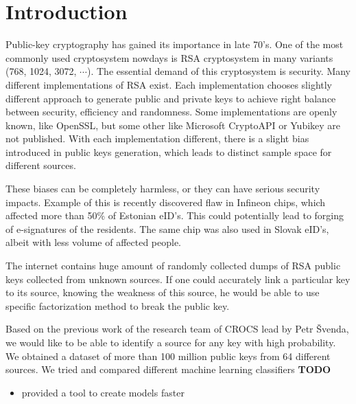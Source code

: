 \chapter*{Introduction}

Public-key cryptography has gained its importance in late 70's. One of the most commonly used cryptosystem nowdays is RSA cryptosystem in many variants (768, 1024, 3072, $\cdots$). The essential demand of this cryptosystem is security. Many different implementations of RSA exist. Each implementation chooses slightly different approach to generate public and private keys to achieve right balance between security, efficiency and randomness. Some implementations are openly known, like OpenSSL, but some other like Microsoft CryptoAPI or Yubikey are not published. With each implementation different, there is a slight bias introduced in public keys generation, which leads to distinct sample space for different sources. 

These biases can be completely harmless, or they can have serious security impacts. Example of this is recently discovered flaw in Infineon chips\cite{svenda_2}, which affected more than 50\% of Estonian eID's. This could potentially lead to forging of e-signatures of the residents. The same chip was also used in Slovak eID's, albeit with less volume of affected people.

The internet contains huge amount of randomly collected dumps of RSA public keys collected from unknown sources. If one could accurately link a particular key to its source, knowing the weakness of this source, he would be able to use specific factorization method to break the public key.

Based on the previous work\cite{svenda_1}\cite{svenda_3} of the research team of CROCS lead by Petr Švenda, we would like to be able to identify a source for any key with high probability. We obtained a dataset of more than 100 million public keys from 64 different sources. We tried and compared different machine learning classifiers \textbf{TODO}

\begin{itemize}

\item provided a tool to create models faster

\end{itemize}
